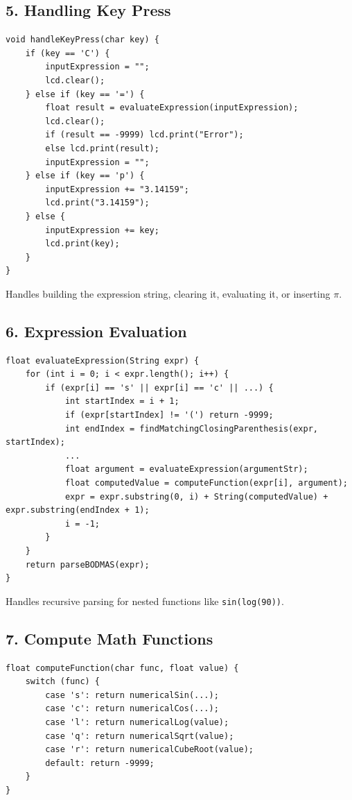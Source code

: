 \documentclass[12pt]{article}
\begin{document}
\subsection*{5. Handling Key Press}
\begin{lstlisting}
void handleKeyPress(char key) {
    if (key == 'C') {
        inputExpression = "";
        lcd.clear();
    } else if (key == '=') {
        float result = evaluateExpression(inputExpression);
        lcd.clear();
        if (result == -9999) lcd.print("Error");
        else lcd.print(result);
        inputExpression = "";
    } else if (key == 'p') {
        inputExpression += "3.14159";
        lcd.print("3.14159");
    } else {
        inputExpression += key;
        lcd.print(key);
    }
}
\end{lstlisting}
Handles building the expression string, clearing it, evaluating it, or inserting \(\pi\).

\subsection*{6. Expression Evaluation}
\begin{lstlisting}
float evaluateExpression(String expr) {
    for (int i = 0; i < expr.length(); i++) {
        if (expr[i] == 's' || expr[i] == 'c' || ...) {
            int startIndex = i + 1;
            if (expr[startIndex] != '(') return -9999;
            int endIndex = findMatchingClosingParenthesis(expr, startIndex);
            ...
            float argument = evaluateExpression(argumentStr);
            float computedValue = computeFunction(expr[i], argument);
            expr = expr.substring(0, i) + String(computedValue) + expr.substring(endIndex + 1);
            i = -1;
        }
    }
    return parseBODMAS(expr);
}
\end{lstlisting}
Handles recursive parsing for nested functions like \texttt{sin(log(90))}.

\subsection*{7. Compute Math Functions}
\begin{lstlisting}
float computeFunction(char func, float value) {
    switch (func) {
        case 's': return numericalSin(...);
        case 'c': return numericalCos(...);
        case 'l': return numericalLog(value);
        case 'q': return numericalSqrt(value);
        case 'r': return numericalCubeRoot(value);
        default: return -9999;
    }
}
\end{lstlisting}
\end{document}
